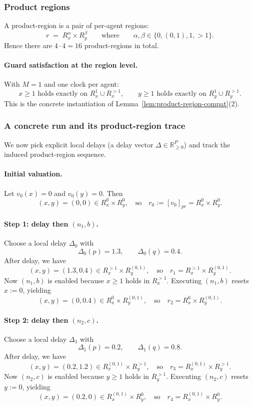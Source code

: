 \subsubsection*{Product regions}
A product-region is a pair of per-agent regions:
\[
r \;=\; R_x^{\alpha}\times R_y^{\beta}
\qquad\text{where}\qquad
\alpha,\beta \in \{0,(0,1),1,>1\}.
\]
Hence there are $4\cdot 4 = 16$ product-regions in total.

\paragraph{Guard satisfaction at the region level.}
With $M=1$ and one clock per agent:
\[
x \ge 1 \text{ holds exactly on } R_x^1 \cup R_x^{>1},
\qquad
y \ge 1 \text{ holds exactly on } R_y^1 \cup R_y^{>1}.
\]
This is the concrete instantiation of Lemma~\ref{lem:product-region-compat}(2).

\subsubsection*{A concrete run and its product-region trace}
We now pick explicit local delays (a delay vector $\Delta\in\mathbb{R}_{\ge 0}^P$)
and track the induced product-region sequence.

\paragraph{Initial valuation.}
Let $v_0(x)=0$ and $v_0(y)=0$. Then
\[
(x,y)=(0,0)\in R_x^0\times R_y^0,
\quad\text{so}\quad
r_0 := [v_0]_{pr} = R_x^0\times R_y^0.
\]

\paragraph{Step 1: delay then $(n_1,b)$.}
Choose a local delay $\Delta_0$ with
\[
\Delta_0(p)=1.3,\qquad \Delta_0(q)=0.4.
\]
After delay, we have
\[
(x,y)=(1.3,0.4)\in R_x^{>1}\times R_y^{(0,1)},
\quad\text{so}\quad
r_1 = R_x^{>1}\times R_y^{(0,1)}.
\]
Now $(n_1,b)$ is enabled because $x\ge 1$ holds in $R_x^{>1}$.
Executing $(n_1,b)$ resets $x:=0$, yielding
\[
(x,y)=(0,0.4)\in R_x^0\times R_y^{(0,1)},
\quad\text{so}\quad
r_2 = R_x^0\times R_y^{(0,1)}.
\]

\paragraph{Step 2: delay then $(n_2,c)$.}
Choose a local delay $\Delta_1$ with
\[
\Delta_1(p)=0.2,\qquad \Delta_1(q)=0.8.
\]
After delay, we have
\[
(x,y)=(0.2,1.2)\in R_x^{(0,1)}\times R_y^{>1},
\quad\text{so}\quad
r_3 = R_x^{(0,1)}\times R_y^{>1}.
\]
Now $(n_2,c)$ is enabled because $y\ge 1$ holds in $R_y^{>1}$.
Executing $(n_2,c)$ resets $y:=0$, yielding
\[
(x,y)=(0.2,0)\in R_x^{(0,1)}\times R_y^0,
\quad\text{so}\quad
r_4 = R_x^{(0,1)}\times R_y^{0}.
\]

